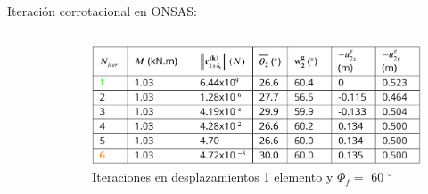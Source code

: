 \documentclass[
  aspectratio=169,
]{beamer}
\begin{document}
\begin{small}
\begin{frame}[t]{Iteración corrotacional en ONSAS:}
\begin{columns}[T,onlytextwidth]
\begin{column}{.4\textwidth}
			\begin{minipage}{\textwidth}
				\begin{figure}
					\centering
					\def\svgwidth{60mm}
					
				\end{figure}
			\end{minipage}
		\end{column}
		\begin{column}{.57\textwidth}
			\pause
			\begin{figure}[htbp]
				\includegraphics[width=1.01\textwidth]{./imagenes/ResultadosNumericos/uniformCantilever/TableIteraciones.png}
				\caption{Iteraciones en desplazamientos 1 elemento y $\Phi_f=$ 60 $^{\circ}$}	
			\end{figure}
		\end{column}
	\end{columns}
\end{frame}




\end{small}
\end{document}
